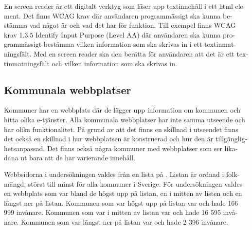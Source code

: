 \documentclass[11p]{article}
\begin{document}
\begin{otherlanguage}{swedish}
    En screen reader är ett digitalt verktyg som läser upp textinnehåll i ett html element.
    Det finns WCAG krav där användaren programmässigt ska kunna bestämma vad något är och vad det har för funktion.
    Till exempel finns WCAG krav 1.3.5 Identify Input Purpose (Level AA) där användaren ska kunna programmässigt bestämma vilken information som ska skrivas in i ett textinmatningsfält.
    Med en screen reader ska den berätta för användaren att det är ett textinmatningsfält och vilken information som ska skrivas in.

    \subsection{Kommunala webbplatser} %
    Kommuner har en webbplats där de lägger upp information om kommunen och hitta olika e-tjänster.
    Alla kommunala webbplatser har inte samma utseende och har olika funktionalitet.
    På grund av att det finns en skillnad i utseendet finns det också en skillnad i hur webbplatsen är konstruerad och hur den är tillgänglighetsanpassad.
    Det finns också några kommuner med webbplatser som ser likadana ut bara att de har varierande innehåll.
    
    Webbsidorna i undersökningen valdes från en lista på \textcite{SverigesKommuner}.
    Listan är ordnad i folkmängd, störst till minst för alla kommuner i Sverige.
    För undersökningen valdes en webbplats som var bland de högst upp på listan, en i mitten av listen och en längst ner på listan.
    Kommunen som var högst upp på listan var \textcite{Linköpings_kommun} och hade 166 999 invånare.
    Kommunen som var i mitten av listan var \textcite{Höörs_kommun} och hade 16 595 invånare.
    Kommunen som var längst ner på listan var \textcite{Sorsele_kommun} och hade 2 396 invånare.
    

\end{otherlanguage}
\end{document}
